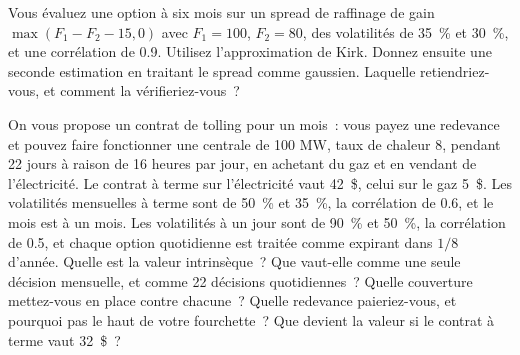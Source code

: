 \begin{question}\label{iq:iv2:commodities-and-energy:19}
Vous évaluez une option à six mois sur un spread de raffinage de gain $\max(F_1 - F_2 - 15, 0)$ avec $F_1 = 100$, $F_2 = 80$, des volatilités de 35~\% et 30~\%, et une corrélation de 0.9. Utilisez l'approximation de Kirk. Donnez ensuite une seconde estimation en traitant le spread comme gaussien. Laquelle retiendriez-vous, et comment la vérifieriez-vous~?
\end{question}

\begin{question}\label{iq:iv2:commodities-and-energy:20}
On vous propose un contrat de tolling pour un mois~: vous payez une redevance et pouvez faire fonctionner une centrale de 100 MW, taux de chaleur 8, pendant 22 jours à raison de 16 heures par jour, en achetant du gaz et en vendant de l'électricité. Le contrat à terme sur l'électricité vaut 42~\$, celui sur le gaz 5~\$. Les volatilités mensuelles à terme sont de 50~\% et 35~\%, la corrélation de 0.6, et le mois est à un mois. Les volatilités à un jour sont de 90~\% et 50~\%, la corrélation de 0.5, et chaque option quotidienne est traitée comme expirant dans $1/8$ d'année. Quelle est la valeur intrinsèque~? Que vaut-elle comme une seule décision mensuelle, et comme 22 décisions quotidiennes~? Quelle couverture mettez-vous en place contre chacune~? Quelle redevance paieriez-vous, et pourquoi pas le haut de votre fourchette~? Que devient la valeur si le contrat à terme vaut 32~\$~?
\end{question}

